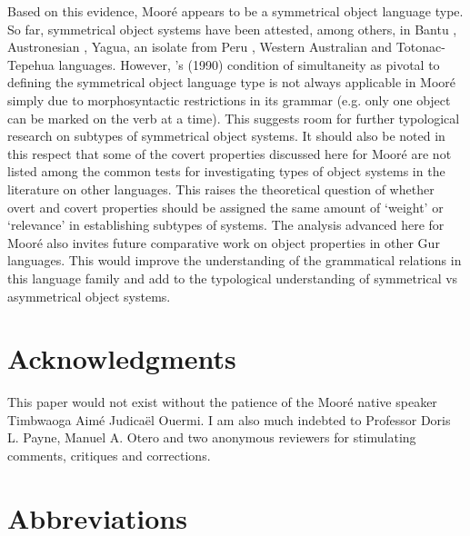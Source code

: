 \documentclass[output=paper]{langsci/langscibook}
\begin{document}
Based on this evidence, Mooré appears to be a symmetrical object language type. So far, symmetrical object systems have been attested, among others, in Bantu \citep{bresnanmoshi1990}, Austronesian \citep{donohue1996}, Yagua, an isolate from Peru \citep{paynepayne1989}, Western Australian \citep{dench1995} and Totonac-Tepehua \citep{mckaytrechsel2008} languages. However, \citeauthor{bresnanmoshi1990}'s (1990)  condition of simultaneity as pivotal to defining the symmetrical object language type is not always applicable in Mooré simply due to morphosyntactic restrictions in its grammar (e.g. only one object can be marked on the verb at a time). This suggests room for further typological research on subtypes of symmetrical object systems. It should also be noted in this respect that some of the covert properties discussed here for Mooré are not listed among the common tests for investigating types of object systems in the literature on other languages. This raises the theoretical question of whether overt and covert properties should be assigned the same amount of `weight' or `relevance' in establishing subtypes of systems. The analysis advanced here for Mooré also invites future comparative work on object properties in other Gur languages. This would improve the understanding of the grammatical relations in this language family and add to the typological understanding of symmetrical vs asymmetrical object systems.

\section*{Acknowledgments}

This paper would not exist without the patience of the Mooré native speaker Timbwaoga Aimé Judicaël Ouermi. I am also much indebted to Professor Doris L. Payne, Manuel A. Otero and two anonymous reviewers for stimulating comments, critiques and corrections. 

\section*{Abbreviations}
\end{document}
